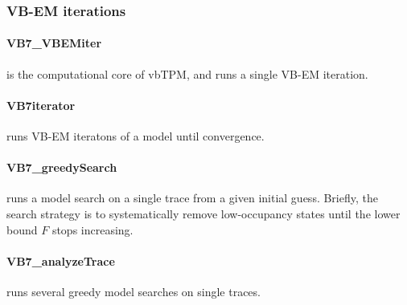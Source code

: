 \subsubsection{VB-EM iterations}
\paragraph{VB7\_VBEMiter} 
is the computational core of vbTPM, and runs a single VB-EM iteration.
\paragraph{VB7iterator} 
runs VB-EM iteratons of a model until convergence.
\paragraph{VB7\_greedySearch}
runs a model search on a single trace from a given initial
guess. Briefly, the search strategy is to systematically remove
low-occupancy states until the lower bound $F$ stops increasing.
\paragraph{VB7\_analyzeTrace}
runs several greedy model searches on single traces. 

